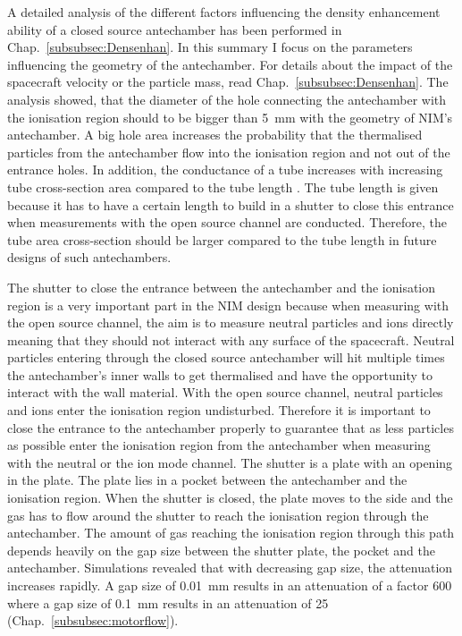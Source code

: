 	A detailed analysis of the different factors influencing the density enhancement ability of a closed source antechamber has been performed in Chap.~\ref{subsubsec:Densenhan}. In this summary I focus on the parameters influencing the geometry of the antechamber. For details about the impact of the spacecraft velocity or the particle mass, read Chap.~\ref{subsubsec:Densenhan}. The analysis showed, that the diameter of the hole connecting the antechamber with the ionisation region should to be bigger than 5~mm with the geometry of NIM's antechamber. A big hole area increases the probability that the thermalised particles from the antechamber flow into the ionisation region and not out of the entrance holes. In addition, the conductance of a tube increases with increasing tube cross-section area compared to the tube length \cite{molFlowTubeTransm_Essen1976}. The tube length is given because it has to have a certain length to build in a shutter to close this entrance when measurements with the open source channel are conducted. Therefore, the tube area cross-section should be larger compared to the tube length in future designs of such antechambers.
	
	The shutter to close the entrance between the antechamber and the ionisation region is a very important part in the NIM design because when measuring with the open source channel, the aim is to measure neutral particles and ions directly meaning that they should not interact with any surface of the spacecraft. Neutral particles entering through the closed source antechamber will hit multiple times the antechamber's inner walls to get thermalised and have the opportunity to interact with the wall material. With the open source channel, neutral particles and ions enter the ionisation region undisturbed. Therefore it is important to close the entrance to the antechamber properly to guarantee that as less particles as possible enter the ionisation region from the antechamber when measuring with the neutral or the ion mode channel. The shutter is a plate with an opening in the plate. The plate lies in a pocket between the antechamber and the ionisation region. When the shutter is closed, the plate moves to the side and the gas has to flow around the shutter to reach the ionisation region through the antechamber. The amount of gas reaching the ionisation region through this path depends heavily on the gap size between the shutter plate, the pocket and the antechamber. Simulations revealed that with decreasing gap size, the attenuation increases rapidly. A gap size of 0.01~mm results in an attenuation of a factor 600 where a gap size of 0.1~mm results in an attenuation of 25 (Chap.~\ref{subsubsec:motorflow}).\\
	
